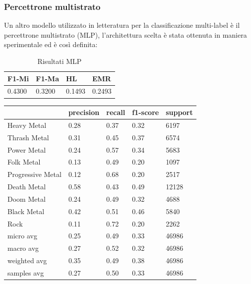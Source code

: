 \documentclass[technote]{IEEEtran}
\begin{document}
\subsubsection{Percettrone multistrato}
Un altro modello utilizzato in letteratura per la classificazione multi-label è il percettrone multistrato (MLP), l'architettura scelta è stata ottenuta in maniera sperimentale ed è così definita:
\begin{table}[H]
\centering
\caption{Risultati MLP}
\begin{tabular}{|l|l|l|l|}
\hline
\textbf{F1-Mi} & \textbf{F1-Ma} & \textbf{HL} & \textbf{EMR} \\ \hline
0.4300         & 0.3200         & 0.1493      & 0.2493       \\ \hline
\end{tabular}
\label{t_res_mlp}
\end{table}
\begin{table}[H]
\centering
\begin{tabular}{|l|l|l|l|l|}
\hline
\textbf{}         & \textbf{precision} & \textbf{recall} & \textbf{f1-score} & \textbf{support} \\ \hline
Heavy Metal       & 0.28               & 0.37            & 0.32              & 6197             \\ \hline
Thrash Metal      & 0.31               & 0.45            & 0.37              & 6574             \\ \hline
Power Metal       & 0.24               & 0.57            & 0.34              & 5683             \\ \hline
Folk Metal        & 0.13               & 0.49            & 0.20              & 1097             \\ \hline
Progressive Metal & 0.12               & 0.68            & 0.20              & 2517             \\ \hline
Death Metal       & 0.58               & 0.43            & 0.49              & 12128            \\ \hline
Doom Metal        & 0.24               & 0.49            & 0.32              & 4688             \\ \hline
Black Metal       & 0.42               & 0.51            & 0.46              & 5840             \\ \hline
Rock              & 0.11               & 0.72            & 0.20              & 2262             \\ \hline
micro avg         & 0.25               & 0.49            & 0.33              & 46986            \\ \hline
macro avg         & 0.27               & 0.52            & 0.32              & 46986            \\ \hline
weighted avg      & 0.35               & 0.49            & 0.38              & 46986            \\ \hline
samples avg       & 0.27               & 0.50            & 0.33              & 46986            \\ \hline
\end{tabular}
\end{table}
\end{document}
